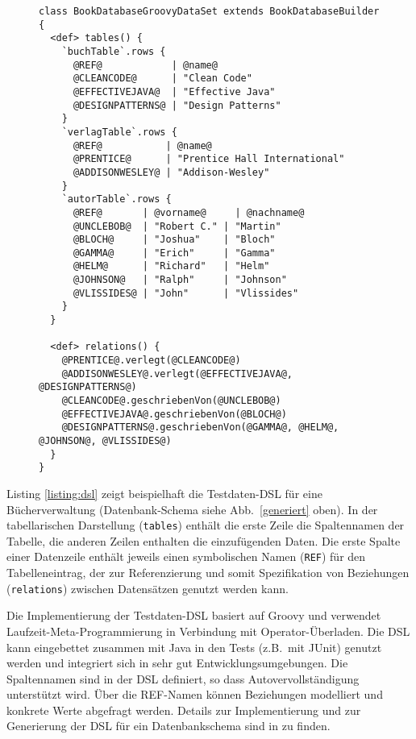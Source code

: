 \begin{figure}[tb]
\begin{lstlisting}[caption=Beispiel: Mittels DSL beschriebenes Testdaten-Set (Table Builder API)., style=java, label=listing:dsl]
class BookDatabaseGroovyDataSet extends BookDatabaseBuilder
{
  <def> tables() {
    `buchTable`.rows {
      @REF@            | @name@
      @CLEANCODE@      | "Clean Code"      
      @EFFECTIVEJAVA@  | "Effective Java"  
      @DESIGNPATTERNS@ | "Design Patterns" 
    }
    `verlagTable`.rows {
      @REF@           | @name@
      @PRENTICE@      | "Prentice Hall International"
      @ADDISONWESLEY@ | "Addison-Wesley"
    }
    `autorTable`.rows {
      @REF@       | @vorname@     | @nachname@
      @UNCLEBOB@  | "Robert C." | "Martin"
      @BLOCH@     | "Joshua"    | "Bloch"
      @GAMMA@     | "Erich"     | "Gamma"
      @HELM@      | "Richard"   | "Helm"
      @JOHNSON@   | "Ralph"     | "Johnson"
      @VLISSIDES@ | "John"      | "Vlissides"    
    }
  }

  <def> relations() {
    @PRENTICE@.verlegt(@CLEANCODE@)
    @ADDISONWESLEY@.verlegt(@EFFECTIVEJAVA@, @DESIGNPATTERNS@)
    @CLEANCODE@.geschriebenVon(@UNCLEBOB@)
    @EFFECTIVEJAVA@.geschriebenVon(@BLOCH@)
    @DESIGNPATTERNS@.geschriebenVon(@GAMMA@, @HELM@, @JOHNSON@, @VLISSIDES@)
  }
}
\end{lstlisting}
\end{figure}


Listing \ref{listing:dsl} zeigt beispielhaft die Testdaten-DSL für eine Bücherverwaltung (Datenbank-Schema siehe Abb.~\ref{generiert} oben). In der tabellarischen Darstellung (\texttt{tables}) enthält die erste Zeile die Spaltennamen der Tabelle, die anderen Zeilen enthalten die einzufügenden Daten. Die erste Spalte einer Datenzeile enthält jeweils einen symbolischen Namen (\texttt{REF}) für den Tabelleneintrag, der zur Referenzierung und somit Spezifikation von Beziehungen (\texttt{relations}) zwischen Datensätzen genutzt werden kann.

Die Implementierung der Testdaten-DSL basiert auf Groovy und verwendet Laufzeit-Meta-Programmierung in Verbindung mit Operator-Überladen. Die DSL kann eingebettet zusammen mit Java in den Tests (z.B.~mit JUnit) genutzt werden und integriert sich in sehr gut Entwicklungsumgebungen. Die Spaltennamen sind in der DSL definiert, so dass Autovervollständigung unterstützt wird. 
%
%
Über die REF-Namen können Beziehungen modelliert und konkrete Werte abgefragt werden. 
%
Details zur Implementierung und zur Generierung der DSL für ein Datenbankschema sind in \cite{MT:Moll:2013} zu finden.


